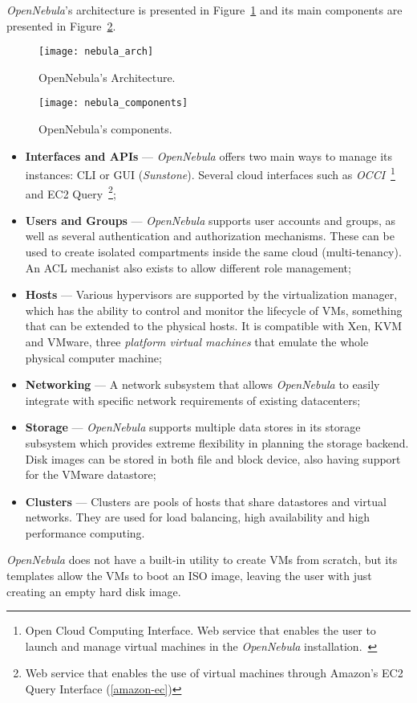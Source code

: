 \textit{OpenNebula}'s architecture is presented in Figure~\ref{fig:nebula_arch} and its main components are presented in Figure~\ref{fig:nebula_components}.

\begin{figure}[h!]
  \begin{center}
    \leavevmode
    \texttt{[image: nebula\_arch]}
    \caption{OpenNebula's Architecture.~\cite{nebulatech}}
    \label{fig:nebula_arch}
  \end{center}
\end{figure}

\begin{figure}[h!]
  \begin{center}
    \leavevmode
    \texttt{[image: nebula\_components]}
    \caption{OpenNebula's components.~\cite{nebulacomponents}}
    \label{fig:nebula_components}
  \end{center} 
\end{figure}


\begin{itemize}
\item \textbf{Interfaces and APIs} --- \textit{OpenNebula} offers two main ways to manage its instances: CLI or GUI (\textit{Sunstone}). Several cloud interfaces such as \textit{OCCI}~\footnote{Open Cloud Computing Interface. Web service that enables the user to launch and manage virtual machines in the \textit{OpenNebula} installation.~\cite{occi}} and EC2 Query~\footnote{Web service that enables the use of virtual machines through Amazon's EC2 Query Interface (\ref{amazon-ec})};
\item \textbf{Users and Groups} --- \textit{OpenNebula} supports user accounts and groups, as well as several authentication and authorization mechanisms. These can be used to create isolated compartments inside the same cloud (multi-tenancy). An ACL mechanist also exists to allow different role management;
\item \textbf{Hosts} --- Various hypervisors are supported by the virtualization manager, which has the ability to control and monitor the lifecycle of VMs, something that can be extended to the physical hosts. It is compatible with Xen, KVM and VMware, three \textit{platform virtual machines} that emulate the whole physical computer machine;
\item \textbf{Networking} --- A network subsystem that allows \textit{OpenNebula} to easily integrate with specific network requirements of existing datacenters;
\item \textbf{Storage} --- \textit{OpenNebula} supports multiple data stores in its storage subsystem which provides extreme flexibility in planning the storage backend. Disk images can be stored in both file and block device, also having support for the VMware datastore;
\item \textbf{Clusters} --- Clusters are pools of hosts that share datastores and virtual networks. They are used for load balancing, high availability and high performance computing.
\end{itemize}
\textit{OpenNebula} does not have a built-in utility to create VMs from scratch, but its templates allow the VMs to boot an ISO image, leaving the user with just creating an empty hard disk image.

